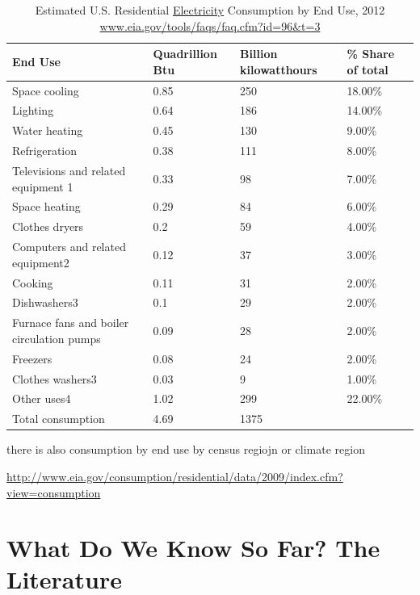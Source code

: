 \documentclass[10pt, letterpaper]{article}
\begin{document}
\begin{spacing}{1.4}
\begin{table}[H]\centering\footnotesize
\caption{\label{eleEndUse}  Estimated U.S. Residential \underline{Electricity} Consumption by End
  Use, 2012 \url{www.eia.gov/tools/faqs/faq.cfm?id=96&t=3}}
\begin{tabular} {llll}   \hline 
End Use&Quadrillion Btu &Billion kilowatthours& \% Share of total\\\hline 
Space cooling&0.85&250&18.00\%\\
Lighting&0.64&186&14.00\%\\
Water heating&0.45&130&9.00\%\\
Refrigeration&0.38&111&8.00\%\\
Televisions and related equipment 1&0.33&98&7.00\%\\
Space heating&0.29&84&6.00\%\\
Clothes dryers&0.2&59&4.00\%\\
Computers and related equipment2&0.12&37&3.00\%\\
Cooking&0.11&31&2.00\%\\
Dishwashers3 &0.1&29&2.00\%\\
Furnace fans and boiler circulation pumps&0.09&28&2.00\%\\
Freezers&0.08&24&2.00\%\\
Clothes washers3&0.03&9&1.00\%\\
Other uses4&1.02&299&22.00\%\\
Total consumption&4.69&1375&\\\hline
\end{tabular}\end{table}

there is also consumption by end use by census regiojn or climate region

\url{http://www.eia.gov/consumption/residential/data/2009/index.cfm?view=consumption}

\section{What Do We Know So Far? The Literature}



\end{spacing}
\end{document}
